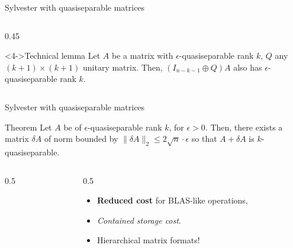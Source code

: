 \documentclass[aspectratio=169,xcolor=dvipsnames]{beamer}
\begin{document}
\begin{frame}{Sylvester with quasiseparable matrices}
\begin{columns}
\begin{column}{0.45\columnwidth}
{	\begin{alertblock}<4->{Technical lemma}
	Let $A$ be a matrix with $\epsilon$-quasiseparable rank $k$,
	$Q$ any $(k+1) \times (k+1)$
	unitary matrix. Then, $(I_{n-k-1} \oplus Q) A$ also has
	$\epsilon$-quasiseparable rank $k$. 
	\end{alertblock}}


	\end{column}
	\end{columns}
		
	\end{frame}

	\begin{frame}{Sylvester with quasiseparable matrices}
		
	\begin{alertblock}{Theorem \parencite[Theorem 2.16]{MR3867617}}
	Let $A$ be of $\epsilon$-quasiseparable rank $k$, for $\epsilon > 0$.
	Then, there exists a matrix $\delta A$ of norm
	bounded by $\|\delta A\|_2 \leq 2 \sqrt{n} \cdot \epsilon$
	so that $A + \delta A$ is $k$-quasiseparable. 
	\end{alertblock}

	\begin{columns}
	\begin{column}{0.5\columnwidth}
	\vspace{1em}	
	
	\vspace{2em}

	\end{column}
	\begin{column}{0.5\columnwidth}
	\centering
	
	
	\begin{itemize}
		\item[\faMoneyBill]<5-> \textbf{Reduced cost} for BLAS-like operations, 
		\item[\faMemory]<6-> \emph{Contained storage cost}.
		\item[\textcolor{Goldenrod}{\faLightbulb}]<7-> Hierarchical matrix formats! 
	\end{itemize}
	

\end{column}
\end{columns}
\end{frame}
\end{document}
